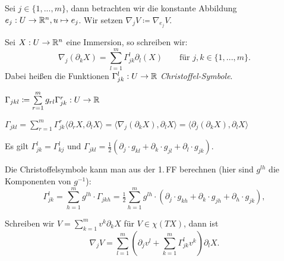 \documentclass{cheat-sheet}
\begin{document}

\begin{nota}
  Sei $j \in \{1, ..., m\}$, dann betrachten wir die konstante Abbildung $e_j : U \to \mathbb{R}^n, u \mapsto e_j$. Wir setzen $\nabla_j V \coloneqq \nabla_{e_j} V$.
\end{nota}

\begin{defn}
  Sei $X : U \to \mathbb{R}^n$ eine Immersion, so schreiben wir:
  \[ \nabla_j (\partial_k X) = \sum_{l=1}^m \Gamma_{jk}^l \partial_l (X)  \qquad \text{für $j,k \in \{ 1, ..., m \}$.} \]
  Dabei heißen die Funktionen $\Gamma_{jk}^l : U \to \mathbb{R}$ \emph{Christoffel-Symbole}.
\end{defn}

\begin{nota}
  $\Gamma_{jkl} \coloneqq \sum_{r=1}^m g_{rl} \Gamma_{jk}^r : U \to \R$
\end{nota}

\begin{satz}
  $\Gamma_{jkl}\!=\!\sum_{r=1}^m \Gamma_{jk}^{r} \langle \partial_r X, \partial_l X \rangle\!=\!\langle \nabla_j (\partial_k X), \partial_l X \rangle\!=\!\langle \partial_j (\partial_k X), \partial_l X \rangle$
\end{satz}

\begin{satz}
    Es gilt $\Gamma_{jk}^l = \Gamma_{kj}^l \,\, \text{und} \,\, \Gamma_{jkl} = \tfrac{1}{2} (\partial_j \cdot g_{kl} + \partial_k \cdot g_{jl} + \partial_l \cdot g_{jk})$.
\end{satz}

\begin{bem}
  Die Christoffelsymbole kann man aus der 1.\,FF berechnen (hier sind $g^{lh}$ die Komponenten von $g^{-1}$):
  \[
    \Gamma_{jk}^l = \sum_{h=1}^m g^{lh} \cdot \Gamma_{jkh} 
    = \tfrac{1}{2} \sum_{h=1}^m g^{lh} \cdot (\partial_j \cdot g_{kh} + \partial_k \cdot g_{jh} + \partial_h \cdot g_{jk}),
  \]
\end{bem}

\begin{bem}
  Schreiben wir $V = \sum_{k=1}^m v^k \partial_k X$ für $V \in \chi(TX)$, dann ist
  \[ \nabla_j V = \sum_{l=1}^m \left( \partial_j v^l + \sum_{k=1}^m \Gamma_{jk}^l v^k \right) \partial_l X. \]
\end{bem}


\end{document}
